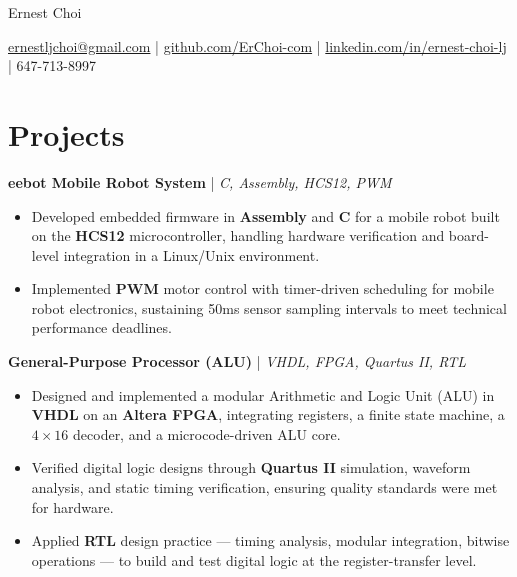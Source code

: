 \documentclass[11pt]{article}
\begin{document}
\centerline{\Huge Ernest Choi}
\vspace{3pt}

\centerline{%
  \href{mailto:ernestljchoi@gmail.com}{ernestljchoi@gmail.com} |
  \href{https://www.github.com/ErChoi-com}{github.com/ErChoi-com} |
  \href{https://www.linkedin.com/in/ernest-choi-lj}{linkedin.com/in/ernest-choi-lj} |
  647-713-8997
}


\section*{Projects}

\textbf{eebot Mobile Robot System} | \textit{C, Assembly, HCS12, PWM} \\ %
\begin{itemize}
  \item Developed embedded firmware in \textbf{Assembly} and \textbf{C} for a mobile robot built on the \textbf{HCS12} microcontroller, handling hardware verification and board-level integration in a Linux/Unix environment.
  \item Implemented \textbf{PWM} motor control with timer-driven scheduling for mobile robot electronics, sustaining 50ms sensor sampling intervals to meet technical performance deadlines.
\end{itemize}

\textbf{General-Purpose Processor (ALU)} | \textit{VHDL, FPGA, Quartus II, RTL} \\ %
\begin{itemize}
  \item Designed and implemented a modular Arithmetic and Logic Unit (ALU) in \textbf{VHDL} on an \textbf{Altera FPGA}, integrating registers, a finite state machine, a $4\times16$ decoder, and a microcode-driven ALU core.
  \item Verified digital logic designs through \textbf{Quartus II} simulation, waveform analysis, and static timing verification, ensuring quality standards were met for hardware.
  \item Applied \textbf{RTL} design practice — timing analysis, modular integration, bitwise operations — to build and test digital logic at the register-transfer level.
\end{itemize}
\end{document}
